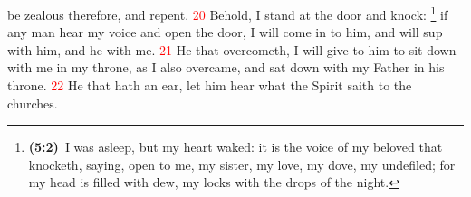 \documentclass[12pt,twoside]{memoir}
\newcommand{\cbibleref}[3]{\textbf{\ibibleverse{#1}(#2)}\ {#3}}
\newcommand{\cbiblefoot}[3]{\footnote{\cbibleref{#1}{#2}{#3}}}
\newlength{\drop}
\newcommand{\vnum}[1]{\textcolor{red}{\normalsize{#1}}}
\begin{document}
 be zealous therefore, and repent. %
\vnum{20} Behold, I stand at the door and knock:%
	\cbiblefoot{SongofSongs}{5:2}{I was asleep, but my heart waked: it is the voice of my beloved that knocketh, saying, open to me, my sister, my love, my dove, my undefiled; for my head is filled with dew, my locks with the drops of the night.}
 if any man hear my voice and open the door, I will come in to him, and will sup with him, and he with me. %
\vnum{21} He that overcometh, I will give to him to sit down with me in my throne, as I also overcame, and sat down with my Father in his throne. %
\vnum{22} He that hath an ear, let him hear what the Spirit saith to the churches.

\end{document}
